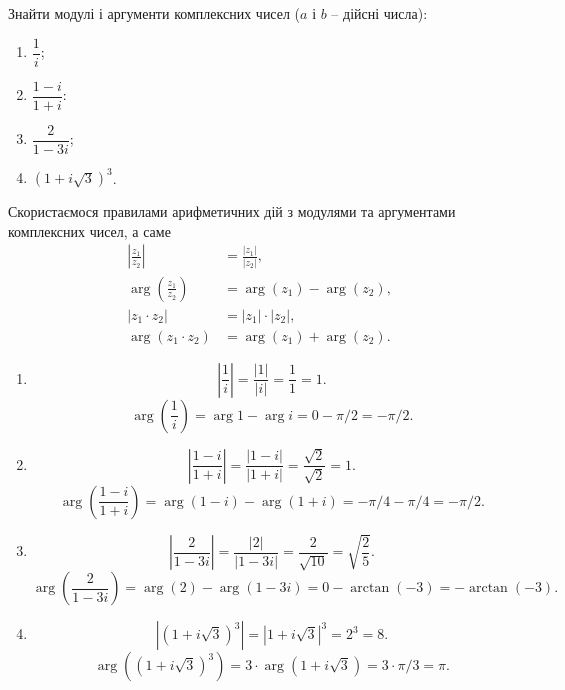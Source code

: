 




\setcounter{section}{1}

\setcounter{problem}{1}
\begin{problem}
	Знайти модулі і аргументи комплексних чисел ($a$ і $b$ -- дійсні числа):
	\begin{multicols}{4}
		\begin{enumerate}
			\item $\dfrac1i$;
			\item $\dfrac{1-i}{1+i}$:
			\item $\dfrac2{1-3i}$;
			\item $\left(1+i\sqrt{3}\right)^3$.
		\end{enumerate}
	\end{multicols}
\end{problem}
\begin{solution}
	Скористаємося правилами арифметичних дій з модулями та аргументами комплексних чисел, а саме 
	\begin{align}
		\label{eq:1.1}
		\left|\frac{z_1}{z_2}\right|&=\frac{|z_1|}{|z_2|},\\
		\arg\left(\frac{z_1}{z_2}\right)&=\arg(z_1)-\arg(z_2),\\
		\left|z_1\cdot z_2\right|&=|z_1|\cdot|z_2|,\\
		\arg(z_1\cdot z_2)&=\arg(z_1)+\arg(z_2).
	\end{align}
	\begin{enumerate}
		\item \[\left|\dfrac1i\right|=\dfrac{|1|}{|i|}=\dfrac11=1.\]
		\[\arg\left(\dfrac1i\right)=\arg1-\arg i=0-\pi/2=-\pi/2.\]
		\item \[\left|\dfrac{1-i}{1+i}\right|=\dfrac{|1-i|}{|1+i|}=\dfrac{\sqrt{2}}{\sqrt{2}}=1.\]
		\[\arg\left(\dfrac{1-i}{1+i}\right)=\arg(1-i)-\arg(1+i)=-\pi/4-\pi/4=-\pi/2.\]
		\item \[\left|\dfrac2{1-3i}\right|=\dfrac{|2|}{|1-3i|}=\dfrac2{\sqrt{10}}=\sqrt{\frac25}.\]
		\[\arg\left(\dfrac2{1-3i}\right)=\arg(2)-\arg(1-3i)=0-\arctan(-3)=-\arctan(-3).\]
		\item \[\left|\left(1+i\sqrt{3}\right)^3\right| = \left|1+i\sqrt{3}\right|^3=2^3=8.\]
		\[\arg\left(\left(1+i\sqrt{3}\right)^3\right)=3\cdot\arg\left(1+i\sqrt{3}\right)=3\cdot\pi/3=\pi.\]
	\end{enumerate}
\end{solution}

